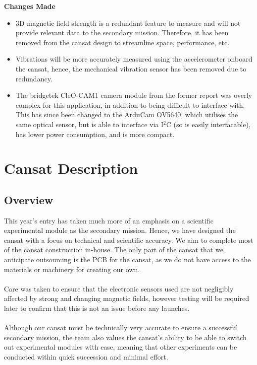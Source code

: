 \documentclass{report}
\begin{document}
		{\color{blue} \textbf{Changes Made}
		\begin{itemize}
			\item 3D magnetic field strength is a redundant feature to measure
			and will not provide relevant data to the secondary mission. Therefore,
			it has been removed from the cansat design to streamline space, 
			performance, etc.
			\item Vibrations will be more accurately measured using the 
			accelerometer onboard the cansat, hence, the mechanical vibration
			sensor has been removed due to redundancy.
			\item The bridgetek CleO-CAM1 camera module from the former 
			report was overly complex for this application, in addition to being
			difficult to interface with. This has since been changed to the ArduCam
			OV5640, which utilises the same optical sensor, but is able to interface
			via I$^2$C (so is easily interfacable), has lower power consumption, and
			is more compact.
		\end{itemize}
		}


\chapter{Cansat Description}
	\section{Overview}
		This year’s entry has taken much more of an emphasis on a scientific
		experimental module as the secondary mission. Hence, we have designed 
		the cansat with a focus on technical and scientific accuracy. We aim to
		complete most of the cansat construction in-house. The only part of the
		cansat that we anticipate outsourcing is the PCB for the cansat, as we do
		not have access to the materials or machinery for creating our own.
		\\\\
		Care was taken to ensure that the electronic sensors used are not 
		negligibly affected by strong and changing magnetic fields, however 
		testing will be required later to confirm that this is not an issue before 
		any launches.
		\\\\
		{\color{blue}Although our cansat must be technically very accurate to ensure
		a successful secondary mission, the team also values the cansat's ability
		to be able to switch out experimental modules with ease, meaning that
		other experiments can be conducted within quick succession and minimal
		effort.}
\end{document}
